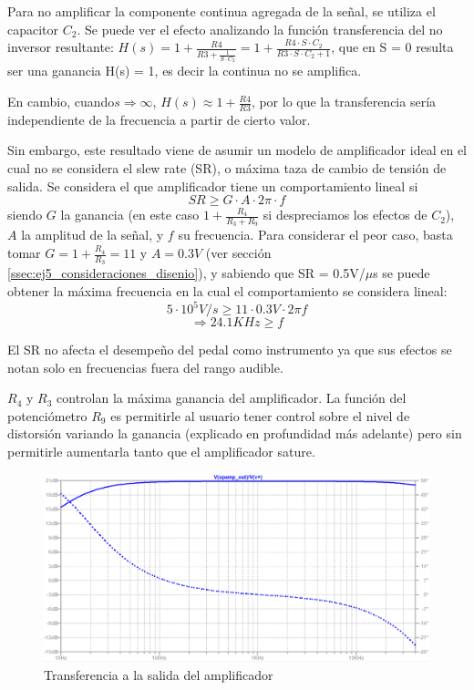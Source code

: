 \documentclass[../../main.tex]{subfiles}
\begin{document}
Para no amplificar la componente continua agregada de la señal, se utiliza el capacitor $C_2$. Se puede ver el efecto analizando la funci\'on transferencia del no inversor resultante: $H(s) = 1 + \frac{R4}{R3+\frac{1}{S\cdot C_2}} = 1 + \frac{R4\cdot S\cdot C_2}{R3\cdot S\cdot C_2+1}$, que en S = 0 resulta ser una ganancia H(s) = 1, es decir la continua no se amplifica. \par

En cambio, cuando$ s \Rightarrow \infty$,  $H(s) \approx 1 + \frac{R4}{R3}$, por lo que la transferencia sería independiente de la frecuencia a partir de cierto valor. \par

Sin embargo, este resultado viene de asumir un modelo de amplificador ideal en el cual no se considera el slew rate (SR), o máxima taza de cambio de tensi\'on de salida.
Se considera el que amplificador tiene un comportamiento lineal si \[SR \geqslant G\cdot A\cdot 2\pi\cdot f\] siendo $G$ la ganancia (en este caso $1+\frac{R_4}{R_3+R_9}$ si despreciamos los efectos de $C_2$), $A$ la amplitud de la se\~nal, y $f$ su frecuencia. Para considerar el peor caso, basta tomar $G = 1+\frac{R_4}{R_3}=11$ y $A=0.3V$ (ver secci\'on \ref{ssec:ej5_consideraciones_disenio}), y sabiendo que SR = 0.5V/$\mu$s se puede obtener la m\'axima frecuencia en la cual el comportamiento se considera lineal:
\[5\cdot 10^5 V/s\geqslant 11\cdot 0.3V \cdot 2\pi f\]
\[\Rightarrow 24.1KHz \geqslant f\]

El SR no afecta el desempe\~no del pedal como instrumento ya que sus efectos se notan solo en frecuencias fuera del rango audible.

$R_4$ y $R_3$ controlan la m\'axima ganancia del amplificador. La funci\'on del potenci\'ometro $R_9$ es permitirle al usuario tener control sobre el nivel de distorsi\'on variando la ganancia (explicado en profundidad más adelante) pero sin permitirle aumentarla tanto que el amplificador sature.

\begin{figure}[H]
	\centering
	\includegraphics[scale=.4]{imagenes/bode_opamp_simulacion_300mv.png}
	\caption{Transferencia a la salida del amplificador}
	\label{fig:ej5_transferencia_opamp}
\end{figure}
\end{document}
